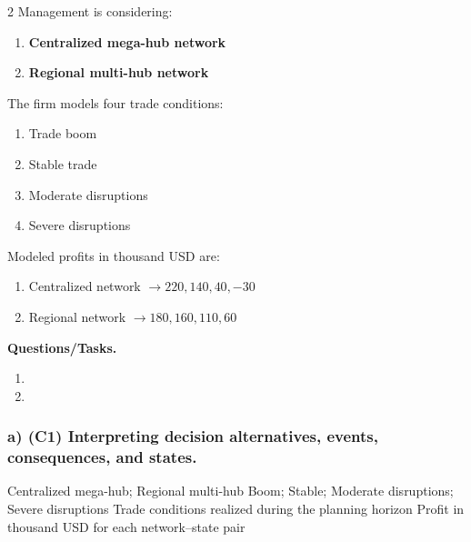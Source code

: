 	\begin{multicols}{2}
		Management is considering:
		\begin{enumerate}[label=\arabic*.]
			\item \textbf{Centralized mega-hub network}
			\item \textbf{Regional multi-hub network}
		\end{enumerate}
	
		The firm models four trade conditions:
		\begin{enumerate}[label=\arabic*.]
			\item Trade boom
			\item Stable trade
			\item Moderate disruptions
			\item Severe disruptions
		\end{enumerate}
	
			\columnbreak
	
		Modeled profits in thousand USD are:
		\begin{enumerate}[label=\arabic*.]
			\item Centralized network $\to 220, 140, 40, -30$
			\item Regional network $\to 180, 160, 110, 60$
		\end{enumerate}
	\end{multicols}

	\textbf{Questions/Tasks.}
	\begin{enumerate}[label=\textbf{\alph*)}]
		\item {}
		\item {}
	\end{enumerate}
	
	\subsubsection*{a) \textbf{(C1)} Interpreting decision alternatives, events, consequences, and states.}
	\label{subsec:problem3-global-shipping-network-design-c1}
	\DecisionElementsTable
	{Centralized mega-hub; Regional multi-hub}
	{Boom; Stable; Moderate disruptions; Severe disruptions}
	{Trade conditions realized during the planning horizon}
	{Profit in thousand USD for each network--state pair}
	
